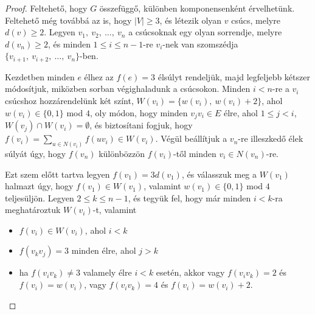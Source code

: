 \documentclass[12pt, a4paper]{report}
\theoremstyle{remark}
\theoremstyle{definition}
\begin{document}
\begin{proof}
Feltehető, hogy $G$ összefüggő, különben komponensenként érvelhetünk. Feltehető még továbbá az is, hogy $|V| \geq 3$, és létezik olyan $v$ csúcs, melyre $d(v) \geq 2$. Legyen $v_1,\ v_2,\ \ldots,\ v_n$ a csúcsoknak egy olyan sorrendje, melyre $d(v_n) \geq 2$, és minden $1 \leq i \leq n-1$-re $v_i$-nek van szomszédja $\lbrace v_{i+1},\ v_{i+2},\ \ldots,\ v_n \rbrace$-ben.

Kezdetben minden $e$ élhez az $f(e) = 3$ élsúlyt rendeljük, majd legfeljebb kétszer módosítjuk, miközben sorban végighaladunk a csúcsokon. Minden $i < n$-re a $v_i$ csúcshoz hozzárendelünk két színt, $W(v_i) = \lbrace w(v_i),\ w(v_i) +2 \rbrace$, ahol $w(v_i) \in \lbrace 0, 1 \rbrace$ mod $4$, oly módon, hogy minden $v_j v_i \in E$ élre, ahol $1 \leq j < i$, $W(v_j) \cap W(v_i) = \emptyset$, és biztosítani fogjuk, hogy $f(v_i) = \sum\limits_{u \in N(v_i)} f(uv_i) \in W(v_i)$. Végül beállítjuk a $v_n$-re illeszkedő élek súlyát úgy, hogy $f(v_n)$ különbözzön $f(v_i)$-től minden $v_i \in N(v_n)$-re.

Ezt szem előtt tartva legyen $f(v_1) = 3d(v_1)$, és válasszuk meg a $W(v_1)$ halmazt úgy, hogy $f(v_1) \in W(v_1)$, valamint $w(v_1) \in \lbrace 0, 1 \rbrace$ mod $4$ teljesüljön. Legyen $2 \leq k \leq n - 1$, és tegyük fel, hogy már minden $i < k$-ra meghatároztuk $W(v_i)$-t, valamint
\begin{itemize}
\item $f(v_i) \in W(v_i)$, ahol $i < k$
\item $f(v_k v_j) = 3$ minden élre, ahol $j > k$
\item ha $f(v_i v_k) \neq 3$ valamely élre $i < k$ esetén, akkor vagy $f(v_i v_k) = 2$ és $f(v_i) = w(v_i)$, vagy $f(v_i v_k) = 4$ és $f(v_i) = w(v_i) + 2$.
\end{itemize}


\end{proof}
\end{document}
